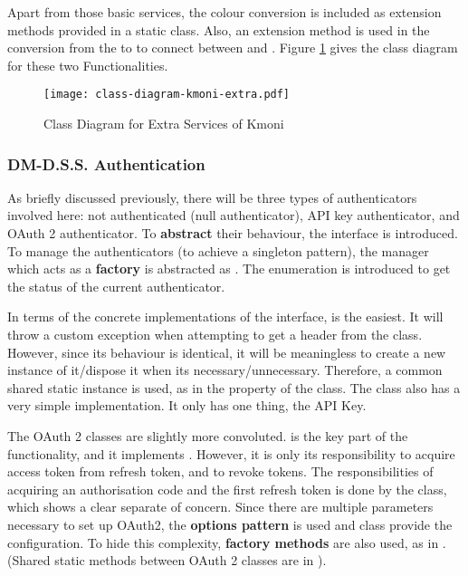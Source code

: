 Apart from those basic services, the colour conversion is included as extension methods provided in a static class. Also, an extension method is used in the conversion from the  to  to connect between  and . Figure \ref{fig:class-diagram-kmoni-extra} gives the class diagram for these two Functionalities.

\begin{figure}[htp]
    \centering
    \texttt{[image: class-diagram-kmoni-extra.pdf]}
    \caption{Class Diagram for Extra Services of Kmoni}
    \label{fig:class-diagram-kmoni-extra}
\end{figure}

\subsubsection{DM-D.S.S. Authentication}

As briefly discussed previously, there will be three types of authenticators involved here: not authenticated (null authenticator), API key authenticator, and OAuth 2 authenticator. To \textbf{abstract} their behaviour, the interface  is introduced. To manage the authenticators (to achieve a singleton pattern), the manager which acts as a \textbf{factory} is abstracted as . The enumeration  is introduced to get the status of the current authenticator.

In terms of the concrete implementations of the interface,  is the easiest. It will throw a custom exception  when attempting to get a header from the class. However, since its behaviour is identical, it will be meaningless to create a new instance of it/dispose it when its necessary/unnecessary. Therefore, a common shared static instance is used, as in the  property of the class. The  class also has a very simple implementation. It only has one thing, the API Key.

The OAuth 2 classes are slightly more convoluted.  is the key part of the functionality, and it implements . However, it is only its responsibility to acquire access token from refresh token, and to revoke tokens. The responsibilities of acquiring an authorisation code and the first refresh token is done by the  class, which shows a clear separate of concern. Since there are multiple parameters necessary to set up OAuth2, the \textbf{options pattern} is used and  class provide the configuration. To hide this complexity, \textbf{factory methods} are also used, as in . (Shared static methods between OAuth 2 classes are in ).

